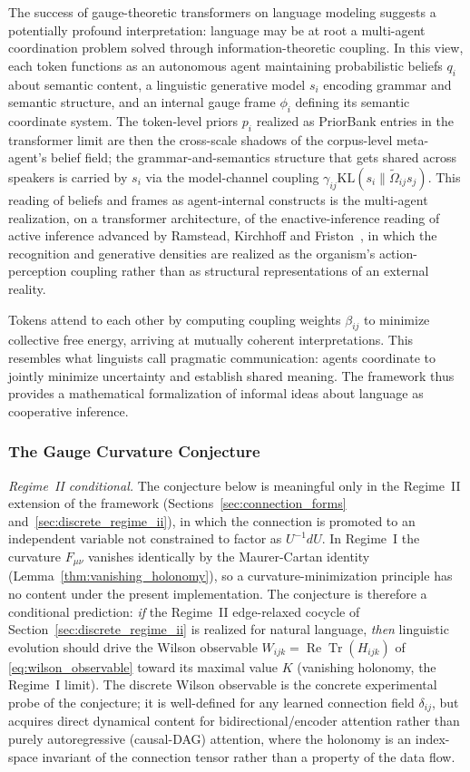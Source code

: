 \documentclass[11pt]{article}
\begin{document}
The success of gauge-theoretic transformers on language modeling suggests a potentially profound interpretation: language may be at root a multi-agent coordination problem solved through information-theoretic coupling. In this view, each token functions as an autonomous agent maintaining probabilistic beliefs $q_i$ about semantic content, a linguistic generative model $s_i$ encoding grammar and semantic structure, and an internal gauge frame $\phi_i$ defining its semantic coordinate system. The token-level priors $p_i$ realized as PriorBank entries in the transformer limit are then the cross-scale shadows of the corpus-level meta-agent's belief field; the grammar-and-semantics structure that gets shared across speakers is carried by $s_i$ via the model-channel coupling $\gamma_{ij}\mathrm{KL}(s_i\|\tilde\Omega_{ij}s_j)$. This reading of beliefs and frames as agent-internal constructs is the multi-agent realization, on a transformer architecture, of the enactive-inference reading of active inference advanced by Ramstead, Kirchhoff and Friston~\cite{Ramstead2019}, in which the recognition and generative densities are realized as the organism's action-perception coupling rather than as structural representations of an external reality.

Tokens attend to each other by computing coupling weights $\beta_{ij}$ to minimize collective free energy, arriving at mutually coherent interpretations. This resembles what linguists call pragmatic communication: agents coordinate to jointly minimize uncertainty and establish shared meaning. The framework thus provides a mathematical formalization of informal ideas about language as cooperative inference.

\subsubsection{The Gauge Curvature Conjecture}
\label{sec:gauge_curvature_conjecture}

\emph{Regime~II conditional.} The conjecture below is meaningful only in the Regime~II extension of the framework (Sections~\ref{sec:connection_forms} and~\ref{sec:discrete_regime_ii}), in which the connection is promoted to an independent variable not constrained to factor as $U^{-1}dU$. In Regime~I the curvature $F_{\mu\nu}$ vanishes identically by the Maurer-Cartan identity (Lemma~\ref{thm:vanishing_holonomy}), so a curvature-minimization principle has no content under the present implementation. The conjecture is therefore a conditional prediction: \emph{if} the Regime~II edge-relaxed cocycle of Section~\ref{sec:discrete_regime_ii} is realized for natural language, \emph{then} linguistic evolution should drive the Wilson observable $W_{ijk} = \operatorname{Re}\operatorname{Tr}(H_{ijk})$ of \eqref{eq:wilson_observable} toward its maximal value $K$ (vanishing holonomy, the Regime~I limit). The discrete Wilson observable is the concrete experimental probe of the conjecture; it is well-defined for any learned connection field $\delta_{ij}$, but acquires direct dynamical content for bidirectional/encoder attention rather than purely autoregressive (causal-DAG) attention, where the holonomy is an index-space invariant of the connection tensor rather than a property of the data flow.
\end{document}
